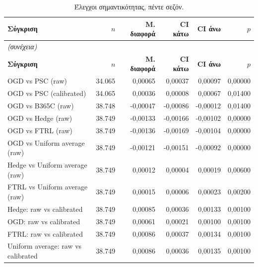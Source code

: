 {\footnotesize
\begin{longtable}{@{}lrrrrr@{}}
\caption{Έλεγχοι σημαντικότητας, πέντε σεζόν.}\label{app:rwsig}\\
\toprule \textbf{Σύγκριση} & \textbf{$n$} & \textbf{Μ. διαφορά} & \textbf{CI κάτω} & \textbf{CI άνω} & \textbf{$p$} \\\midrule\endfirsthead
\multicolumn{6}{l}{\emph{(συνέχεια)}}\\\toprule \textbf{Σύγκριση} & \textbf{$n$} & \textbf{Μ. διαφορά} & \textbf{CI κάτω} & \textbf{CI άνω} & \textbf{$p$} \\\midrule\endhead
\bottomrule\endfoot
OGD vs PSC (raw) & 34.065 & 0,00065 & 0,00037 & 0,00097 & 0,00000 \\
OGD vs PSC (calibrated) & 34.065 & 0,00036 & 0,00008 & 0,00067 & 0,01400 \\
OGD vs B365C (raw) & 38.748 & -0,00047 & -0,00086 & -0,00012 & 0,01400 \\
OGD vs Hedge (raw) & 38.749 & -0,00133 & -0,00166 & -0,00102 & 0,00000 \\
OGD vs FTRL (raw) & 38.749 & -0,00136 & -0,00169 & -0,00104 & 0,00000 \\
OGD vs Uniform average (raw) & 38.749 & -0,00121 & -0,00151 & -0,00092 & 0,00000 \\
Hedge vs Uniform average (raw) & 38.749 & 0,00012 & 0,00004 & 0,00019 & 0,00600 \\
FTRL vs Uniform average (raw) & 38.749 & 0,00015 & 0,00006 & 0,00023 & 0,00200 \\
Hedge: raw vs calibrated & 38.749 & 0,00085 & 0,00036 & 0,00133 & 0,00100 \\
OGD: raw vs calibrated & 38.749 & 0,00061 & 0,00021 & 0,00100 & 0,00100 \\
FTRL: raw vs calibrated & 38.749 & 0,00086 & 0,00037 & 0,00134 & 0,00100 \\
Uniform average: raw vs calibrated & 38.749 & 0,00086 & 0,00036 & 0,00135 & 0,00100 \\
\end{longtable}
}

